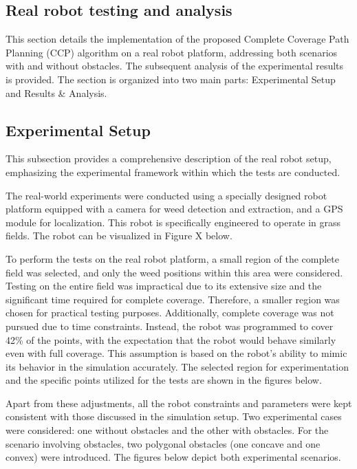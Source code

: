 
\subsection{Real robot testing and analysis} 

This section details the implementation of the proposed Complete Coverage Path Planning (CCP) algorithm on a real robot platform, addressing both scenarios with and without obstacles. The subsequent analysis of the experimental results is provided. The section is organized into two main parts: Experimental Setup and Results \& Analysis.

\subsection{Experimental Setup}

This subsection provides a comprehensive description of the real robot setup, emphasizing the experimental framework within which the tests are conducted.

\vspace*{6mm}   


The real-world experiments were conducted using a specially designed robot platform equipped with a camera for weed detection and extraction, and a GPS module for localization. This robot is specifically engineered to operate in grass fields. The robot can be visualized in Figure X below.

\vspace*{6mm}   


To perform the tests on the real robot platform, a small region of the complete field was selected, and only the weed positions within this area were considered. Testing on the entire field was impractical due to its extensive size and the significant time required for complete coverage. Therefore, a smaller region was chosen for practical testing purposes. Additionally, complete coverage was not pursued due to time constraints. Instead, the robot was programmed to cover 42\% of the points, with the expectation that the robot would behave similarly even with full coverage. This assumption is based on the robot's ability to mimic its behavior in the simulation accurately. The selected region for experimentation and the specific points utilized for the tests are shown in the figures below.

\vspace*{6mm}   


Apart from these adjustments, all the robot constraints and parameters were kept consistent with those discussed in the simulation setup. Two experimental cases were considered: one without obstacles and the other with obstacles. For the scenario involving obstacles, two polygonal obstacles (one concave and one convex) were introduced. The figures below depict both experimental scenarios.


